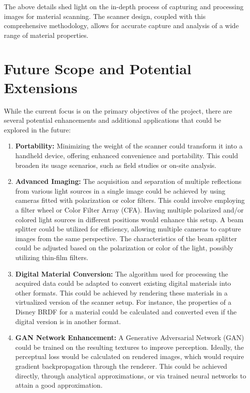 \documentclass[11pt, twoside, listof=totocnumbered, bibliography=totocnumbered]{scrartcl}
\begin{document}
The above details shed light on the in-depth process of capturing and processing images for material scanning. The scanner design, coupled with this comprehensive methodology, allows for accurate capture and analysis of a wide range of material properties.


\section{Future Scope and Potential Extensions}

While the current focus is on the primary objectives of the project, there are several potential enhancements and additional applications that could be explored in the future:

\begin{enumerate}
	\item \textbf{Portability:} Minimizing the weight of the scanner could transform it into a handheld device, offering enhanced convenience and portability. This could broaden its usage scenarios, such as field studies or on-site analysis.
	\item \textbf{Advanced Imaging:} The acquisition and separation of multiple reflections from various light sources in a single image could be achieved by using cameras fitted with polarization or color filters. This could involve employing a filter wheel or Color Filter Array (CFA). Having multiple polarized and/or colored light sources in different positions would enhance this setup. A beam splitter could be utilized for efficiency, allowing multiple cameras to capture images from the same perspective. The characteristics of the beam splitter could be adjusted based on the polarization or color of the light, possibly utilizing thin-film filters.
	\item \textbf{Digital Material Conversion:} The algorithm used for processing the acquired data could be adapted to convert existing digital materials into other formats. This could be achieved by rendering these materials in a virtualized version of the scanner setup. For instance, the properties of a Disney BRDF for a material could be calculated and converted even if the digital version is in another format.
	\item \textbf{GAN Network Enhancement:} A Generative Adversarial Network (GAN) could be trained on the resulting textures to improve perception. Ideally, the perceptual loss would be calculated on rendered images, which would require gradient backpropagation through the renderer. This could be achieved directly, through analytical approximations, or via trained neural networks to attain a good approximation.

\end{enumerate}
\end{document}
